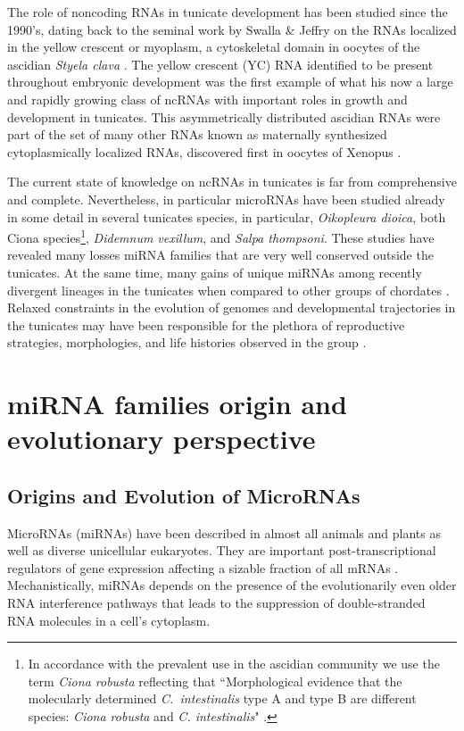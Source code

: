 \documentclass[graybox]{svmult}
\begin{document}
The role of noncoding RNAs in tunicate development has been studied since
the 1990's, dating back to the seminal work by Swalla \& Jeffry on the RNAs
localized in the yellow crescent or myoplasm, a cytoskeletal domain in
oocytes of the ascidian \textit{Styela clava} \cite{Swalla1995}. The yellow
crescent (YC) RNA identified to be present throughout embryonic development
was the first example of what his now a large and rapidly growing class of
ncRNAs with important roles in growth and development in tunicates. This
asymmetrically distributed ascidian RNAs were part of the set of many other
RNAs known as maternally synthesized cytoplasmically localized RNAs,
discovered first in oocytes of Xenopus \cite{Bashirullah1998}.

The current state of knowledge on ncRNAs in tunicates is far from
comprehensive and complete. Nevertheless, in particular microRNAs have been
studied already in some detail in several tunicates species, in particular,
\textit{Oikopleura dioica}, both Ciona species\footnote{In accordance with
  the prevalent use in the ascidian community we use the term \textit{Ciona
    robusta} reflecting that ``Morphological evidence that the molecularly
  determined \textit{C.\ intestinalis} type A and type B are different
  species: \textit{Ciona robusta} and \textit{C.  intestinalis}"
  \cite{Brunetti:2015}.}, \textit{Didemnum vexillum}, and \textit{Salpa
  thompsoni}. These studies have revealed many losses miRNA families that
are very well conserved outside the tunicates. At the same time, many gains
of unique miRNAs among recently divergent lineages in the tunicates when
compared to other groups of chordates \cite{Fu:08,
  Velandia-Huerto2016}. Relaxed constraints in the evolution of genomes and
developmental trajectories in the tunicates may have been responsible for
the plethora of reproductive strategies, morphologies, and life histories
observed in the group \cite{Holland2015}.

\section{miRNA families origin and evolutionary perspective}
\label{sec:2}

\subsection{Origins and Evolution of MicroRNAs}

MicroRNAs (miRNAs) have been described in almost all animals and plants as
well as diverse unicellular eukaryotes. They are important
post-transcriptional regulators of gene expression affecting a sizable
fraction of all mRNAs \cite{Ameres:13}. Mechanistically, miRNAs depends on
the presence of the evolutionarily even older RNA interference pathways
\cite{Cerutti:06, Shabalina:08} that leads to the suppression of
double-stranded RNA molecules in a cell's cytoplasm.
\end{document}
